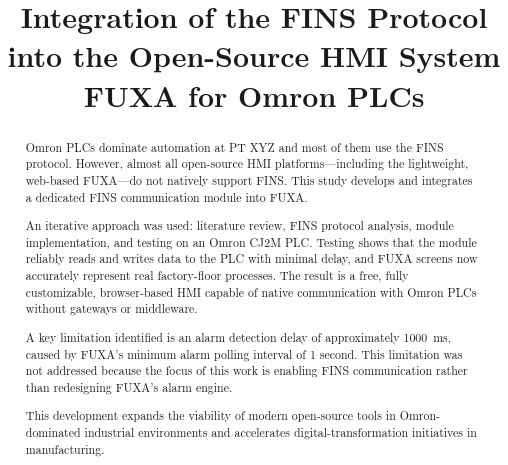 \documentclass[conference]{IEEEtran}
\begin{document}
\title{Integration of the FINS Protocol into the Open-Source HMI System FUXA for Omron PLCs}

\author{
\and
{}
\and
{}
}

\maketitle

\begin{abstract}
Omron PLCs dominate automation at PT XYZ and most of them use the FINS protocol. However, almost all open-source HMI platforms—including the lightweight, web-based FUXA—do not natively support FINS. This study develops and integrates a dedicated FINS communication module into FUXA.

An iterative approach was used: literature review, FINS protocol analysis, module implementation, and testing on an Omron CJ2M PLC. Testing shows that the module reliably reads and writes data to the PLC with minimal delay, and FUXA screens now accurately represent real factory-floor processes. The result is a free, fully customizable, browser-based HMI capable of native communication with Omron PLCs without gateways or middleware.

A key limitation identified is an alarm detection delay of approximately 1000~ms, caused by FUXA’s minimum alarm polling interval of 1 second. This limitation was not addressed because the focus of this work is enabling FINS communication rather than redesigning FUXA’s alarm engine.

This development expands the viability of modern open-source tools in Omron-dominated industrial environments and accelerates digital-transformation initiatives in manufacturing.
\end{abstract}
\end{document}
